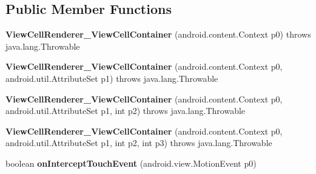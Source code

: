 \subsection*{Public Member Functions}
\begin{DoxyCompactItemize}
\item 
\mbox{\label{classmd5b60ffeb829f638581ab2bb9b1a7f4f3f_1_1_view_cell_renderer___view_cell_container_a2573ac4de7f2671992a9bfa260bc4fe1}} 
{\bfseries View\+Cell\+Renderer\+\_\+\+View\+Cell\+Container} (android.\+content.\+Context p0)  throws java.\+lang.\+Throwable 	
\item 
\mbox{\label{classmd5b60ffeb829f638581ab2bb9b1a7f4f3f_1_1_view_cell_renderer___view_cell_container_aba0f4072dbb2ab5be4a473be900ab2b7}} 
{\bfseries View\+Cell\+Renderer\+\_\+\+View\+Cell\+Container} (android.\+content.\+Context p0, android.\+util.\+Attribute\+Set p1)  throws java.\+lang.\+Throwable 	
\item 
\mbox{\label{classmd5b60ffeb829f638581ab2bb9b1a7f4f3f_1_1_view_cell_renderer___view_cell_container_aca3e2863fea87a844ab7185a603c7e3c}} 
{\bfseries View\+Cell\+Renderer\+\_\+\+View\+Cell\+Container} (android.\+content.\+Context p0, android.\+util.\+Attribute\+Set p1, int p2)  throws java.\+lang.\+Throwable 	
\item 
\mbox{\label{classmd5b60ffeb829f638581ab2bb9b1a7f4f3f_1_1_view_cell_renderer___view_cell_container_a4760e07b60b324dc64a274ef17c71f4c}} 
{\bfseries View\+Cell\+Renderer\+\_\+\+View\+Cell\+Container} (android.\+content.\+Context p0, android.\+util.\+Attribute\+Set p1, int p2, int p3)  throws java.\+lang.\+Throwable 	
\item 
\mbox{\label{classmd5b60ffeb829f638581ab2bb9b1a7f4f3f_1_1_view_cell_renderer___view_cell_container_ada3c5da37f05ad33b1f3e2af8acb10d1}} 
boolean {\bfseries on\+Intercept\+Touch\+Event} (android.\+view.\+Motion\+Event p0)
\item 

\end{DoxyCompactItemize}

